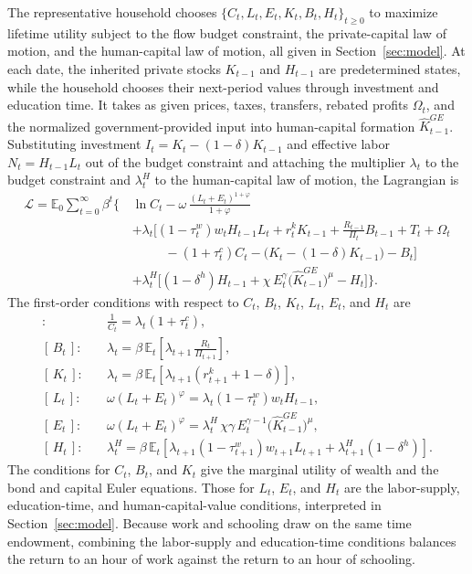 \documentclass[a4paper,11pt]{article}
\begin{document}
The representative household chooses $\{C_t, L_t, E_t, K_t, B_t, H_t\}_{t\ge 0}$ to maximize lifetime utility subject to the flow budget constraint, the private-capital law of motion, and the human-capital law of motion, all given in Section~\ref{sec:model}.
At each date, the inherited private stocks $K_{t-1}$ and $H_{t-1}$ are predetermined states, while the household chooses their next-period values through investment and education time.
It takes as given prices, taxes, transfers, rebated profits $\Omega_t$, and the normalized government-provided input into human-capital formation $\hat{K}_{t-1}^{GE}$.
Substituting investment $I_t = K_t - (1-\delta) K_{t-1}$ and effective labor $N_t = H_{t-1} L_t$ out of the budget constraint and attaching the multiplier $\lambda_t$ to the budget constraint and $\lambda_t^{H}$ to the human-capital law of motion, the Lagrangian is
\begin{equation*}
\begin{aligned}
\mathcal{L} = \mathbb{E}_0 \sum_{t=0}^{\infty} \beta^t \Big\{\, & \ln C_t - \omega\,\frac{\left(L_t + E_t\right)^{1+\varphi}}{1+\varphi} \\[2pt]
& + \lambda_t \Big[ \left(1-\tau_t^{w}\right) w_t H_{t-1} L_t + r_t^{k} K_{t-1} + \tfrac{R_{t-1}}{\Pi_t} B_{t-1} + T_t + \Omega_t \\
& \qquad\;\; - \left(1+\tau_t^{c}\right) C_t - \big(K_t - (1-\delta) K_{t-1}\big) - B_t \Big] \\[2pt]
& + \lambda_t^{H} \Big[ \left(1-\delta^{h}\right) H_{t-1} + \chi\, E_t^{\gamma} \big(\hat{K}_{t-1}^{GE}\big)^{\mu} - H_t \Big] \Big\}.
\end{aligned}
\end{equation*}
The first-order conditions with respect to $C_t$, $B_t$, $K_t$, $L_t$, $E_t$, and $H_t$ are
\begin{align*}
[\,C_t\,]:&\quad \frac{1}{C_t} = \lambda_t \left(1+\tau_t^{c}\right), \\
[\,B_t\,]:&\quad \lambda_t = \beta\, \mathbb{E}_t\!\left[\lambda_{t+1}\, \frac{R_t}{\Pi_{t+1}}\right], \\
[\,K_t\,]:&\quad \lambda_t = \beta\, \mathbb{E}_t\!\left[\lambda_{t+1}\left(r_{t+1}^{k} + 1 - \delta\right)\right], \\
[\,L_t\,]:&\quad \omega\left(L_t + E_t\right)^{\varphi} = \lambda_t \left(1-\tau_t^{w}\right) w_t H_{t-1}, \\
[\,E_t\,]:&\quad \omega\left(L_t + E_t\right)^{\varphi} = \lambda_t^{H}\, \chi\gamma\, E_t^{\gamma-1} \big(\hat{K}_{t-1}^{GE}\big)^{\mu}, \\
[\,H_t\,]:&\quad \lambda_t^{H} = \beta\, \mathbb{E}_t\!\left[\lambda_{t+1}\left(1-\tau_{t+1}^{w}\right) w_{t+1} L_{t+1} + \lambda_{t+1}^{H}\left(1-\delta^{h}\right)\right].
\end{align*}
The conditions for $C_t$, $B_t$, and $K_t$ give the marginal utility of wealth and the bond and capital Euler equations.
Those for $L_t$, $E_t$, and $H_t$ are the labor-supply, education-time, and human-capital-value conditions, interpreted in Section~\ref{sec:model}.
Because work and schooling draw on the same time endowment, combining the labor-supply and education-time conditions balances the return to an hour of work against the return to an hour of schooling.
\end{document}
